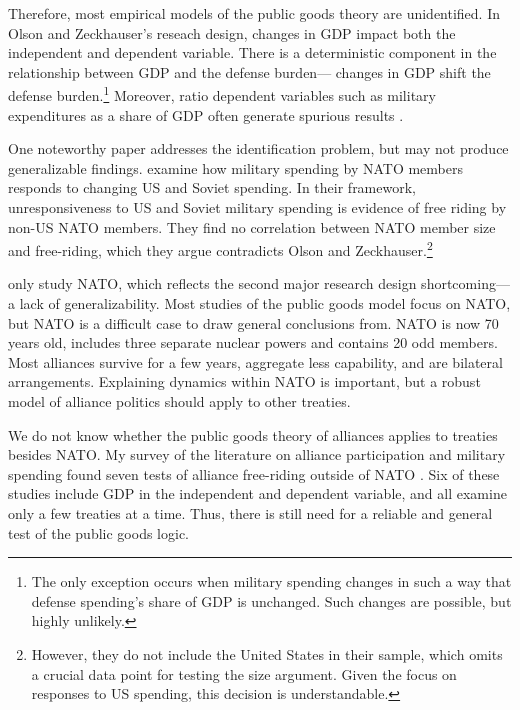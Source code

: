 \documentclass[12pt]{article}
\begin{document}
Therefore, most empirical models of the public goods theory are unidentified.
In Olson and Zeckhauser's reseach design, changes in GDP impact both the independent and dependent variable. 
There is a deterministic component in the relationship between GDP and the defense burden--- changes in GDP shift the defense burden.\footnote{
The only exception occurs when military spending changes in such a way that defense spending's share of GDP is unchanged. Such changes are possible, but highly unlikely.}  
Moreover, ratio dependent variables such as military expenditures as a share of GDP often generate spurious results \citep{Kronmal1993}. 


One noteworthy paper addresses the identification problem, but may not produce generalizable findings. 
\citet{PluemperNeumayer2015} examine how military spending by NATO members responds to changing US and Soviet spending. 
In their framework, unresponsiveness to US and Soviet military spending is evidence of free riding by non-US NATO members.
They find no correlation between NATO member size and free-riding, which they argue contradicts Olson and Zeckhauser.\footnote{
However, they do not include the United States in their sample, which omits a crucial data point for testing the size argument. Given the focus on responses to US spending, this decision is understandable.}


\citet{PluemperNeumayer2015} only study NATO, which reflects the second major research design shortcoming--- a lack of generalizability. 
Most studies of the public goods model focus on NATO, but NATO is a difficult case to draw general conclusions from. 
NATO is now 70 years old, includes three separate nuclear powers and contains 20 odd members. 
Most alliances survive for a few years, aggregate less capability, and are bilateral arrangements. 
Explaining dynamics within NATO is important, but a robust model of alliance politics should apply to other treaties. 


We do not know whether the public goods theory of alliances applies to treaties besides NATO. 
My survey of the literature on alliance participation and military spending found seven tests of alliance free-riding outside of NATO \citep{Russett1970, Starr1974, Reisinger1983, Thies1987, ConybeareSandler1990, OnealWhatley1996, Siroky2012}. 
Six of these studies include GDP in the independent and dependent variable, and all examine only a few treaties at a time. 
Thus, there is still need for a reliable and general test of the public goods logic. 
\end{document}

